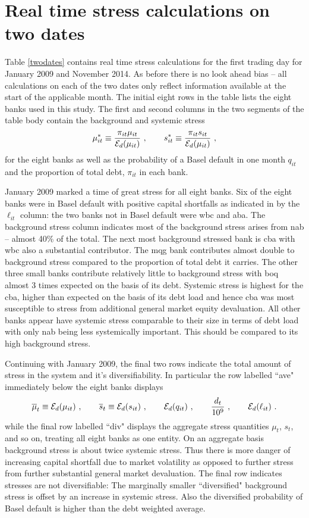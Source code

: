 \documentclass[authoryear]{elsarticle}
\newcommand{\Ex}{{\cal E}}
\newcommand{\tref}[1]{Table \ref{#1}}
\newcommand{\cq}{\ , \qquad}
\begin{document}
\section*{Real time stress calculations on two dates}
 \tref{twodates} contains real time stress calculations for the first trading day for  January 2009 and November 2014.  As before there is no look ahead bias -- all calculations on each of the two dates only reflect information available at the start of the applicable month.  The initial eight rows in the table lists the eight banks used in this study.   The first  and second columns in the two segments of the table body contain the background and systemic stress
$$
\mu^*_{it} \equiv \frac{\pi_{it}\mu_{it}}{\Ex_d(\mu_{it})}\cq s^*_{it} \equiv \frac{\pi_{it}s_{it}}{\Ex_d(\mu_{it})}\ , 
$$
for the eight banks as well as the probability of a Basel default in one month $q_{it}$ and the proportion of total debt, $\pi_{it}$ in each bank.

January 2009 marked a time of great stress for all eight banks.    Six of the eight banks were in Basel default with positive capital shortfalls as indicated in by the $\ell_{it}$ column:   the two banks not in Basel default were wbc and aba.   The background stress column indicates most of the background stress arises from nab -- almost 40\% of the total.   The next most background stressed bank is cba with wbc also a substantial contributor.   The mqg bank contributes almost double to background stress compared to the proportion of total debt  it carries.  The other three small banks contribute relatively little to background stress with boq  almost 3 times expected on the basis of its debt.   Systemic stress is highest for the cba, higher than expected on the basis of its debt load and hence cba was most susceptible to stress from additional general market equity devaluation.    All other banks appear have systemic stress comparable to their size in terms of debt load with only nab being less systemically important.    This should be compared to its high background stress.

Continuing with January 2009, the final two rows indicate the total amount of stress in the system and it's diversifiability.   In particular 
the row labelled ``ave" immediately below the eight banks displays
$$
\overline{\mu}_t\equiv \Ex_d(\mu_{it})\cq \overline{s}_t\equiv\Ex_d(s_{it})\cq\Ex_d(q_{it})\cq \frac{d_t}{10^9}\cq \Ex_d(\ell_{it})\ .
$$
while the final row labelled ``div" displays the aggregate stress quantities $\mu_t$, $s_t$, and so on, treating all eight banks as one entity.
On an aggregate basis background stress is about twice systemic stress.   Thus there is more danger of increasing capital shortfall due to market volatility  as opposed to further stress from further substantial general market devaluation.  The final row indicates stresses are not diversifiable:    The marginally  smaller  ``diversified"  background stress is offset by an increase in systemic stress.    Also the diversified probability of Basel default is higher than the debt weighted average.   
\end{document}
